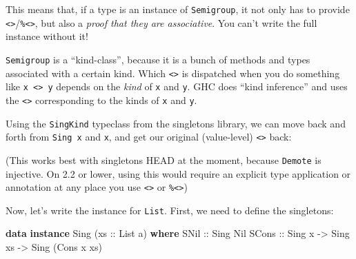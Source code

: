 \documentclass[]{article}
\newenvironment{Shaded}{}{}
\newcommand{\DataTypeTok}[1]{\textcolor[rgb]{0.56,0.13,0.00}{#1}}
\newcommand{\FunctionTok}[1]{\textcolor[rgb]{0.02,0.16,0.49}{#1}}
\newcommand{\KeywordTok}[1]{\textcolor[rgb]{0.00,0.44,0.13}{\textbf{#1}}}
\newcommand{\NormalTok}[1]{#1}
\newcommand{\OtherTok}[1]{\textcolor[rgb]{0.00,0.44,0.13}{#1}}
\begin{document}
This means that, if a type is an instance of \texttt{Semigroup}, it not only has
to provide
\texttt{\textless{}\textgreater{}}/\texttt{\%\textless{}\textgreater{}}, but
also a \emph{proof that they are associative}. You can't write the full instance
without it!

\texttt{Semigroup} is a ``kind-class'', because it is a bunch of methods and
types associated with a certain kind. Which \texttt{\textless{}\textgreater{}}
is dispatched when you do something like
\texttt{x\ \textless{}\textgreater{}\ y} depends on the \emph{kind} of
\texttt{x} and \texttt{y}. GHC does ``kind inference'' and uses the
\texttt{\textless{}\textgreater{}} corresponding to the kinds of \texttt{x} and
\texttt{y}.

Using the \texttt{SingKind} typeclass from the singletons library, we can move
back and forth from \texttt{Sing\ x} and \texttt{x}, and get our original
(value-level) \texttt{\textless{}\textgreater{}} back:

\begin{Shaded}
\end{Shaded}

(This works best with singletons HEAD at the moment, because \texttt{Demote} is
injective. On 2.2 or lower, using this would require an explicit type
application or annotation at any place you use
\texttt{\textless{}\textgreater{}} or \texttt{\%\textless{}\textgreater{}})

Now, let's write the instance for \texttt{List}. First, we need to define the
singletons:

\begin{Shaded}
\begin{Highlighting}[]
\KeywordTok{data} \KeywordTok{instance} \DataTypeTok{Sing}\NormalTok{ (}\OtherTok{xs ::} \DataTypeTok{List}\NormalTok{ a) }\KeywordTok{where}
    \DataTypeTok{SNil}\OtherTok{  ::} \DataTypeTok{Sing} \DataTypeTok{Nil}
    \DataTypeTok{SCons}\OtherTok{ ::} \DataTypeTok{Sing}\NormalTok{ x }\OtherTok{->} \DataTypeTok{Sing}\NormalTok{ xs }\OtherTok{->} \DataTypeTok{Sing}\NormalTok{ (}\DataTypeTok{Cons}\NormalTok{ x xs)}
\end{Highlighting}
\end{Shaded}
\end{document}
